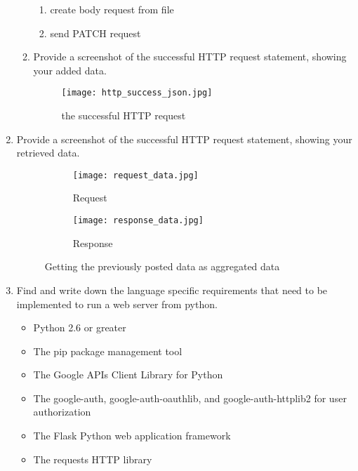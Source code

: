 \documentclass{homework}
\begin{document}
\begin{enumerate}
\begin{enumerate}[label=\alph*)]
\begin{enumerate}[label=\arabic*)]
			\item create body request from file
			\item send PATCH request
		\end{enumerate}
		\item Provide a screenshot of the successful HTTP request statement, showing your added data.
		\newpage
		\begin{figure}[hbt!]
			\centering
			\texttt{[image: http\_success\_json.jpg]}
			\caption{the successful HTTP request}
		\end{figure}
	\end{enumerate}
	\item Provide a screenshot of the successful HTTP request statement, showing your retrieved data.
	\begin{figure}[hbt!]
	     \centering
	     \begin{subfigure}[hbt!]{0.5\textwidth}
		\centering
		\texttt{[image: request\_data.jpg]}
		\caption{Request}
	     \end{subfigure}
	     \hfill
	     \begin{subfigure}[hbt!]{0.45\textwidth}
	         \centering
	         \texttt{[image: response\_data.jpg]}
	         \caption{Response}
	     \end{subfigure}
	        \caption{Getting the previously posted data as aggregated data}
	\end{figure}
	\item Find and write down the language specific requirements that need to be implemented to run a web server from python.
	\begin{itemize}
		\item Python 2.6 or greater
		\item The pip package management tool
		\item The Google APIs Client Library for Python
		\item The google-auth, google-auth-oauthlib, and google-auth-httplib2 for user authorization
		\item The Flask Python web application framework
		\item The requests HTTP library
	\end{itemize}
\end{enumerate}
\end{document}
